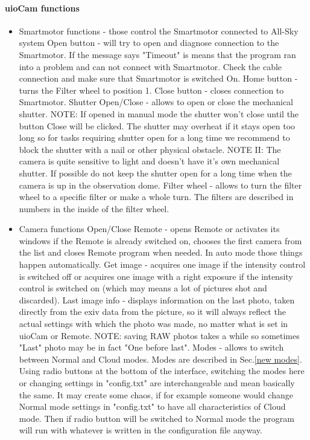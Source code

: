\documentclass[]{book}
\begin{document}
	\paragraph{uioCam functions}
	\begin{itemize}
		\item Smartmotor functions - those control the Smartmotor connected to All-Sky system
			\subitem Open button - will try to open and diagnose connection to the Smartmotor. If the message says "Timeout" is means that the program ran into a problem and can not connect with Smartmotor. Check the cable connection and make sure that Smartmotor is switched On.
			\subitem Home button - turns the Filter wheel to position 1.
			\subitem Close button - closes connection to Smartmotor.
			\subitem Shutter Open/Close - allows to open or close the mechanical shutter. NOTE: If opened in manual mode the shutter won't close until the button Close will be clicked. The shutter may overheat if it stays open too long so for tasks requiring shutter open for a long time we recommend to block the shutter with a nail or other physical obstacle. NOTE II: The camera is quite sensitive to light and doesn't have it's own mechanical shutter. If possible do not keep the shutter open for a long time when the camera is up in the observation dome.
			\subitem Filter wheel - allows to turn the filter wheel to a specific filter or make a whole turn. The filters are described in numbers in the inside of the filter wheel.
		\item Camera functions
			\subitem Open/Close Remote - opens Remote or activates its windows if the Remote is already switched on, chooses the first camera from the list and closes Remote program when needed. In auto mode those things happen automatically.
			\subitem Get image - acquires one image if the intensity control is switched off or acquires one image with a right exposure if the intensity control is switched on (which may means a lot of pictures shot and discarded).
			\subitem Last image info - displays information on the last photo, taken directly from the exiv data from the picture, so it will always reflect the actual settings with which the photo was made, no matter what is set in uioCam or Remote. NOTE: saving RAW photos takes a while so sometimes "Last" photo may be in fact "One before last".
			\subitem Modes - allows to switch between Normal and Cloud modes. Modes are described in Sec.\ref{new modes}. Using radio buttons at the bottom of the interface, switching the modes here or changing settings in "config.txt" are interchangeable and mean basically the same. It may create some chaos, if for example someone would change Normal mode settings in "config.txt" to have all characteristics of Cloud mode. Then if radio button will be switched to Normal mode the program will run with whatever is written in the configuration file anyway.

\end{itemize}
\end{document}
